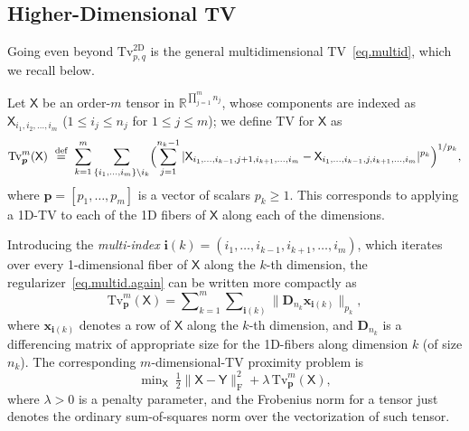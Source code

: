 \documentclass[twoside,11pt]{article}
\newcommand{\vi}{\bm{i}}       \newcommand{\vih}{\hat{\bm{i}}}        \newcommand{\ih}{\hat{i}}    \newcommand{\vit}{\tilde{\bm{i}}}       \newcommand{\itild}{\tilde{i}}
\newcommand{\vp}{\bm{p}}       \newcommand{\vph}{\hat{\bm{p}}}        \newcommand{\ph}{\hat{p}}    \newcommand{\vpt}{\tilde{\bm{p}}}       \newcommand{\pt}{\tilde{p}}
\newcommand{\vx}{\bm{x}}       \newcommand{\vxh}{\hat{\bm{x}}}        \newcommand{\xh}{\hat{x}}    \newcommand{\vxt}{\tilde{\bm{x}}}       \newcommand{\xt}{\tilde{x}}
\newcommand{\md}{\bm{D}}
\newcommand{\tx}{\mathsf{X}}
\newcommand{\ty}{\mathsf{Y}}
\newcommand{\mynorm}[2]{\| {#1} \|_{#2}}
\newcommand{\norm}[2]{\mynorm{#1}{#2}}
\newcommand{\frob}[1]{\|{#1}\|_{\text{F}}}
\newcommand{\set}[1]{\left\{ {#1}\right\}}
\newcommand{\nlsum}{\sum\nolimits}
\newcommand{\nlmin}{\min\nolimits}
\newcommand{\defeq}{\ \stackrel{\text{def}}{=}\ }
\newcommand{\reals}{\mathbb{R}}
\newcommand{\half}{\tfrac{1}{2}}
\newcommand{\sml}[1]{{\small #1}}
\newcommand{\fromto}[3]{\sml{$#1 \le #2 \le #3$}}
\newcommand{\tvell}{\text{Tv}}
\newcommand{\twod}{\text{2D}}
\numberwithin{equation}{section}
\numberwithin{theorem}{section}
\begin{document}
\subsection{Higher-Dimensional TV}
\label{sec:multid}
Going even beyond $\tvell_{p,q}^{\twod}$ is the general multidimensional TV~\eqref{eq.multid}, which we recall below.

Let $\tx$ be an order-$m$ tensor in $\reals^{\prod_{j=1}^m n_j}$, whose components are indexed as $\tx_{i_1,i_2,\ldots,i_m}$ (\fromto{1}{i_j}{n_j} for \fromto{1}{j}{m}); we define TV for $\tx$ as
\begin{equation}
  \label{eq.multid.again}
  \tvell^m_{\vp}(\tx) \defeq \sum_{k=1}^m \sum_{\set{i_1,\ldots,i_m} \setminus i_k}\Bigl(\sum_{j=1}^{n_k-1}
  |\tx_{i_1,\ldots,i_{k-1},j+1,i_{k+1},\ldots,i_m}-\tx_{i_1,\ldots,i_{k-1},j,i_{k+1},\ldots,i_m}|^{p_k}\Bigr)^{1/p_k},
\end{equation}
where $\vp = [p_1,\ldots,p_m]$ is a vector of scalars $p_k \ge 1$. This corresponds to applying a 1D-TV to each of the 1D fibers of $\tx$ along each of the dimensions.

Introducing the \emph{multi-index} $\vi(k) = (i_1,\ldots,i_{k-1},i_{k+1},\ldots,i_m)$, which iterates over every 1-dimensional fiber of $\tx$ along the $k$-th dimension, the regularizer~\eqref{eq.multid.again} can be written more compactly as
\begin{equation}
  \label{eq:17}
  \tvell^m_{\vp}(\tx) = \nlsum_{k=1}^m \nlsum_{\vi(k)}\norm{\md_{n_k} \vx_{\vi(k)}}{p_k},
\end{equation}
where $\vx_{\vi(k)}$ denotes a row of $\tx$ along the $k$-th dimension, and $\md_{n_k}$ is a differencing matrix of appropriate size for the 1D-fibers along dimension $k$ (of size $n_k$).
The corresponding $m$-dimensional-TV proximity problem is
\begin{equation}
  \label{eq:18}
  \nlmin_{\tx}\ \half\frob{\tx-\ty}^2 + \lambda\,\tvell^m_{\vp}(\tx),
\end{equation}
where $\lambda > 0$ is a penalty parameter, and the Frobenius norm for a tensor just denotes the ordinary sum-of-squares norm over the vectorization of such tensor.
\end{document}
